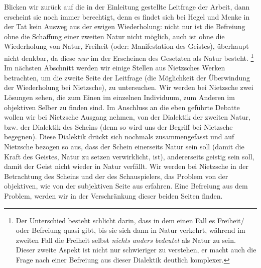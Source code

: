 \documentclass[12pt, a4paper, openany]{report}
\begin{document}
Blicken wir zurück auf die in der Einleitung gestellte Leitfrage der Arbeit, dann erscheint sie noch immer berechtigt, denn es findet sich bei Hegel und Menke in der Tat kein Ausweg aus der ewigen Wiederholung:
nicht nur ist die Befreiung ohne die Schaffung einer zweiten Natur nicht möglich, auch ist ohne die Wiederholung von Natur, Freiheit (oder: Manifestation des Geistes), überhaupt nicht denkbar, da diese \emph{nur} im der Erscheinen des Gesetzten als Natur besteht.%
\footnote{
    Der Unterschied besteht schlicht darin, dass in dem einen Fall es Freiheit/ oder Befreiung quasi  gibt, bis sie sich dann in Natur verkehrt, während im zweiten Fall die Freiheit selbst \emph{nichts anders bedeutet} als Natur zu sein.
    Dieser zweite Aspekt ist nicht nur schwieriger zu verstehen, er macht auch die Frage nach einer Befreiung aus dieser Dialektik deutlich komplexer.
}
Im nächsten Abschnitt werden wir einige Stellen aus Nietzsches Werken betrachten, um die zweite Seite der Leitfrage (die Möglichkeit der Überwindung der Wiederholung bei Nietzsche), zu untersuchen.
Wir werden bei Nietzsche zwei Lösungen sehen, die zum Einen im einzelnen Individuum, zum Anderen im objektiven Selber zu finden sind.
Im Anschluss an die eben geführte Debatte wollen wir bei Nietzsche Ausgang nehmen, von der Dialektik der zweiten Natur, bzw. der Dialektik des Scheins (denn so wird uns der Begriff bei Nietzsche begegnen).
Diese Dialektik drückt sich nochmals zusammengefasst und auf Nietzsche bezogen so aus, dass der Schein einerseits Natur sein soll (damit die Kraft des Geistes, Natur zu setzen verwirklicht, ist), andererseits geistig sein soll, damit der Geist nicht wieder in Natur verfällt. 
Wir werden bei Nietzsche in der Betrachtung des Scheins und der des Schauspielers, das Problem von der objektiven, wie von der subjektiven Seite aus erfahren. 
Eine Befreiung aus dem Problem, werden wir in der Verschränkung dieser beiden Seiten finden. 
\newpage
\end{document}
